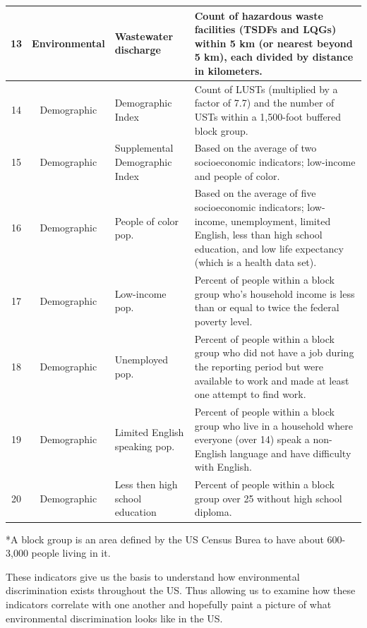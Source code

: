 \documentclass[letterpaper, 10 pt, conference]{ieeeconf}  %
\begin{document}
\begin{table}[h]
\begin{center}
\begin{tabular}{|c|c|p{5cm}|p{5cm}|}
\hline 
 13 & Environmental & Wastewater discharge & Count of hazardous waste facilities (TSDFs and LQGs) within 5 km (or nearest beyond 5 km), each divided by distance in kilometers. \\
\hline 
 14 & Demographic & Demographic Index & Count of LUSTs (multiplied by a factor of 7.7) and the number of USTs within a 1,500-foot buffered block group. \\
\hline 
 15 & Demographic & Supplemental Demographic Index & Based on the average of two socioeconomic indicators; low-income and people of color. \\
\hline 
 16 & Demographic &  People of color pop. & Based on the average of five socioeconomic indicators; low-income, unemployment, limited English, less than high school education, and low life expectancy (which is a health data set). \\
\hline 
 17 & Demographic &  Low-income pop. & Percent of people within a block group who's household income is less than or equal to twice the federal poverty level.\\

\hline 
 18 & Demographic &  Unemployed pop. & Percent of people within a block group who did not have a job during the reporting period but were available to work and made at least one attempt to find work. \\
\hline 
 19 & Demographic &  Limited English speaking pop. & Percent of people within a block group who live in a household where everyone (over 14) speak a non-English language and have difficulty with English.  \\
\hline 
 20 & Demographic &  Less then high school education & Percent of people within a block group over 25 without high school diploma. \\
 \hline
\end{tabular}

\par
*A block group is an area defined by the US Census Burea to have about 600-3,000 people living in it.\par
    
        \end{center}
        \end{table}




These indicators give us the basis to understand how environmental discrimination exists throughout the US. Thus allowing us to examine how these indicators correlate with one another and hopefully paint a picture of what environmental discrimination looks like in the US. \par
\end{document}
